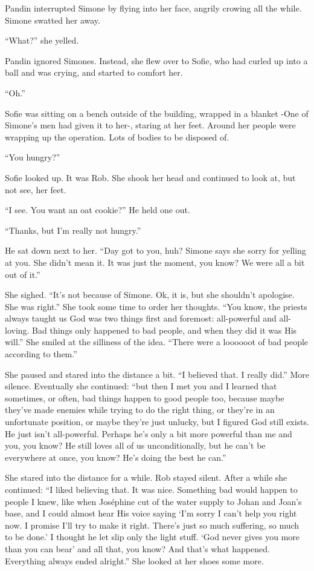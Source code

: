 \documentclass[letterpaper,12pt]{report}
\begin{document}
Pandin interrupted Simone by flying into her face, angrily crowing all the while. Simone swatted her away.

``What?'' she yelled.

Pandin ignored Simones. Instead, she flew over to Sofie, who had curled up into a ball and was crying, and started to comfort her.

``Oh.''
\act

Sofie was sitting on a bench outside of the building, wrapped in a blanket -One of Simone's men had given it to her-, staring at her feet. Around her people were wrapping up the operation. Lots of bodies to be disposed of.

``You hungry?''

Sofie looked up. It was Rob. She shook her head and continued to look at, but not see, her feet.

``I see. You want an oat cookie?'' He held one out.

``Thanks, but I'm really not hungry.''

He sat down next to her. ``Day got to you, huh? Simone says she sorry for yelling at you. She didn't mean it. It was just the moment, you know? We were all a bit out of it.''

She sighed. ``It's not because of Simone. Ok, it is, but she shouldn't apologise. She was right.'' She took some time to order her thoughts. ``You know, the priests always taught us God was two things first and foremost: all-powerful and all-loving. Bad things only happened to bad people, and when they did it was His will.'' She smiled at the silliness of the idea. ``There were a loooooot of bad people according to them.''

She paused and stared into the distance a bit. ``I believed that. I really did.'' More silence. Eventually she continued: ``but then I met you and I learned that sometimes, or often, bad things happen to good people too, because maybe they've made enemies while trying to do the right thing, or they're in an unfortunate position, or maybe they're just unlucky, but I figured God still exists. He just isn't all-powerful. Perhaps he's only a bit more powerful than me and you, you know? He still loves all of us unconditionally, but he can't be everywhere at once, you know? He's doing the best he can.''

She stared into the distance for a while. Rob stayed silent. After a while she continued: ``I liked believing that. It was nice. Something bad would happen to people I knew, like when Jos\'ephine cut of the water supply to Johan and Joan's base, and I could almost hear His voice saying `I'm sorry I can't help you right now. I promise I'll try to make it right. There's just so much suffering, so much to be done.' I thought he let slip only the light stuff. `God never gives you more than you can bear' and all that, you know? And that's what happened. Everything always ended alright.'' She looked at her shoes some more.
\end{document}
